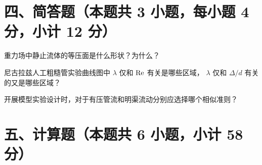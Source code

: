 \section{四、简答题（本题共 3 小题，每小题 4 分，小计 12 分）}

\begin{ti}
  \item 重力场中静止流体的等压面是什么形状？为什么？\hfill{}

  \item 尼古拉兹人工粗糙管实验曲线图中 \(\lambda\) 仅和 \(\mathrm{Re}\) 有关是哪些区域，
  \(\lambda\) 仅和 \(\Delta/d\) 有关的又是哪些区域？\hfill{}

  \item 开展模型实验设计时，对于有压管流和明渠流动分别应选择哪个相似准则？
  \hfill{}
\end{ti}

\section{五、计算题（本题共 6 小题，小计 58 分）}

